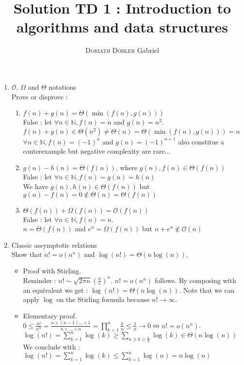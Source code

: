 \documentclass[12pt,4paper]{article}
\title{Solution TD 1 : Introduction to algorithms and data structures}
\author{\textsc{Doriath Döhler} Gabriel}
\begin{document}
\maketitle
\begin{enumerate}

\item $\mathcal{O}$, $\Omega$ and $\Theta$ notations\\
Prove or disprove :
\begin{enumerate}

\item $f(n) + g(n) = \Theta(\min(f(n), g(n)))$\\
False : let $\forall n \in \mathbb{N}, f(n) = n$ and $g(n) = n^2$.\\
$f(n) + g(n) \in \Theta(n^2) \neq \Theta(n) = \Theta(\min(f(n), g(n))) = n$\\
$\forall n \in \mathbb{N}, f(n) = (-1)^n$ and $g(n) = (-1)^{n+1}$ also constitue a conterexample but
negative complexity are rare...

\item $g(n) - h(n) = \Theta(f(n))$, where $g(n), f(n) \in \Theta(f(n))$\\
False : let $\forall n \in \mathbb{N}, f(n)=g(n)=h(n)$\\
We have $g(n), h(n) \in \Theta(f(n))$ but $g(n) - f(n) = 0 \notin\Theta(n) = \Theta(f(n))$

\item $\Theta(f(n)) + \Omega(f(n)) = \mathcal{O}(f(n))$\\
False : let $\forall n \in \mathbb{N}, f(n) = n$.\\
$n = \Theta(f(n))$ and $e^n = \Omega(f(n))$ but $n + e^n \notin \mathcal{O}(n)$

\end{enumerate}


\item Classic assymptotic relations\\
Show that $n!=o(n^n)$ and $\log(n!)=\Theta(n\log(n))$.

\begin{itemize}
\item Proof with Stirling.\\
Reminder : $n! \sim \sqrt{2\pi n} \left(\frac{n}{e}\right)^n$.
$n!=o(n^n)$ follows. By composing with an equivalent we get :
$\log(n!)=\Theta(n\log(n))$. Note that we can apply $\log$ on the Stirling
formula because $n! \to \infty$.

\item Elementary proof.\\
$0 \leq \frac{n!}{n^n} = \frac{n \times (n - 1) \dots \times 1}{n \times \dots \times
n} = \prod_{k=1}^n \frac{k}{n} \leq \frac{1}{n} \to 0$ so $n! = o(n^n)$.\\
$\log(n!)=\sum_{k=1}^n\log(k)\geq \sum_{n\geq k\geq\frac{n}{2}}
\log(k) \in \Theta(n\log(n))$\\
We conclude with : $\log(n!) = \sum_{k=1}^n \log(k) \leq \sum_{k=1}^n \log(n) = n \log(n)$


\end{itemize}
\end{enumerate}
\end{document}
